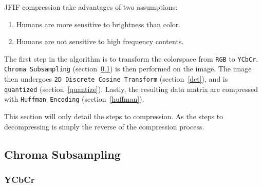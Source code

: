 \documentclass{article}
\begin{document}
JFIF compression take advantages of two assumptions:~\autocite{jpegCornell}
\begin{enumerate}
	\item Humans are more sensitive to brightness than color.
	\item Humans are not sensitive to high frequency contents.
\end{enumerate}

The first step in the algorithm is to transform the colorspace from \texttt{RGB} to \texttt{YCbCr}.
\texttt{Chroma Subsampling} (section~\ref{chroma}) is then performed on the image.
The image then undergoes \texttt{2D Discrete Cosine Transform} (section~\ref{dct}), and is \texttt{quantized} (section~\ref{quantize}).
Lastly, the resulting data matrix are compressed with \texttt{Huffman Encoding} (section~\ref{huffman}).

This section will only detail the steps to compression.
As the steps to decompressing is simply the reverse of the compression process.

\subsection{Chroma Subsampling}\label{chroma}

\subsubsection{YCbCr}
\end{document}
